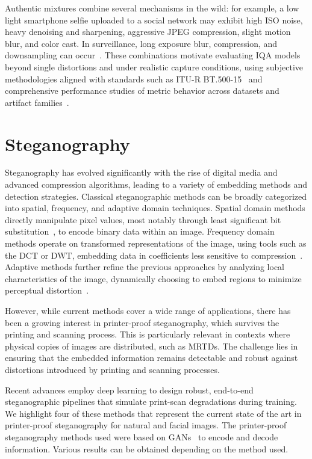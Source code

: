 Authentic mixtures combine several mechanisms in the wild: for example, a low light smartphone selfie uploaded to a social network may exhibit high \acs{ISO} noise, heavy denoising and sharpening, aggressive \acs{JPEG} compression, slight motion blur, and color cast. In surveillance, long exposure blur, compression, and downsampling can occur~\cite{ghadiyaram2015massive,koniq10k,spaq}. These combinations motivate evaluating \acs{IQA} models beyond single distortions and under realistic capture conditions, using subjective methodologies aligned with standards such as \acs{ITU-R BT.500-15}~\cite{itu2023r} and comprehensive performance studies of metric behavior across datasets and artifact families~\cite{survey2019shahrukh,ma2025survey}.

\section{Steganography}\label{sec:steganography}

Steganography has evolved significantly with the rise of digital media and advanced compression algorithms, leading to a variety of embedding methods and detection strategies. Classical steganographic methods can be broadly categorized into spatial, frequency, and adaptive domain techniques. Spatial domain methods directly manipulate pixel values, most notably through least significant bit substitution~\cite{morkel2005steganography}, to encode binary data within an image. Frequency domain methods operate on transformed representations of the image, using tools such as the \acs{DCT} or \acf{DWT}, embedding data in coefficients less sensitive to compression~\cite{survey2016steganography}. Adaptive methods further refine the previous approaches by analyzing local characteristics of the image, dynamically choosing to embed regions to minimize perceptual distortion~\cite{baluja2017steganography}.

However, while current methods cover a wide range of applications, there has been a growing interest in printer-proof steganography, which survives the printing and scanning process. This is particularly relevant in contexts where physical copies of images are distributed, such as \acs{MRTDs}. The challenge lies in ensuring that the embedded information remains detectable and robust against distortions introduced by printing and scanning processes.

Recent advances employ deep learning to design robust, end-to-end steganographic pipelines that simulate print-scan degradations during training. We highlight four of these methods that represent the current state of the art in printer-proof steganography for natural and facial images. The printer-proof steganography methods used were based on \acf{GANs}~\cite{heusel2017gans} to encode and decode information. Various results can be obtained depending on the method used.

